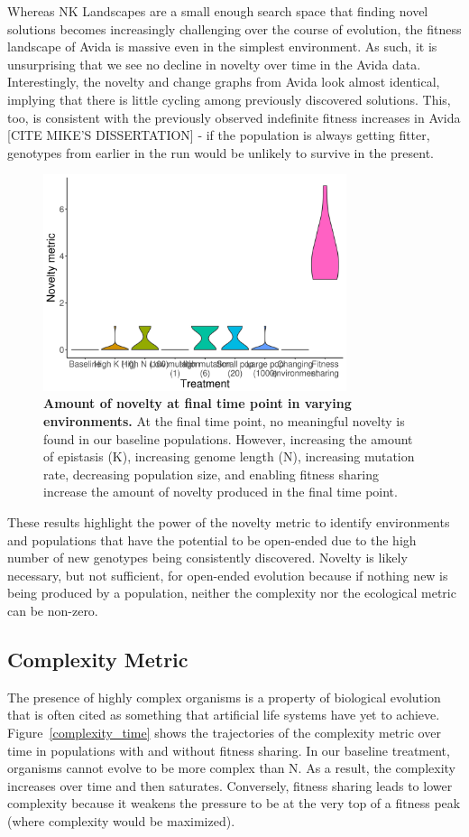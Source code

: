 \documentclass[letterpaper]{article}
\begin{document}
Whereas NK Landscapes are a small enough search space that finding novel solutions becomes increasingly challenging over the course of evolution, the fitness landscape of Avida is massive even in the simplest environment. As such, it is unsurprising that we see no decline in novelty over time in the Avida data. Interestingly, the novelty and change graphs from Avida look almost identical, implying that there is little cycling among previously discovered solutions. This, too, is consistent with the previously observed indefinite fitness increases in Avida [CITE MIKE'S DISSERTATION] - if the population is always getting fitter, genotypes from earlier in the run would be unlikely to survive in the present.

\begin{figure}
\includegraphics[width=3.5in]{figs/noveltyboxplots.png}
\caption{\textbf{Amount of novelty at final time point in varying environments.} At the final time point, no meaningful novelty is found in our baseline populations. However, increasing the amount of epistasis (K), increasing genome length (N), increasing mutation rate, decreasing population size, and enabling fitness sharing increase the amount of novelty produced in the final time point.}
\label{novelty}
\end{figure}

These results highlight the power of the novelty metric to identify environments and populations that have the potential to be open-ended due to the high number of new genotypes being consistently discovered. Novelty is likely necessary, but not sufficient, for open-ended evolution because if nothing new is being produced by a population, neither the complexity nor the ecological metric can be non-zero.

\subsection{Complexity Metric}
    The presence of highly complex organisms is a property of biological evolution that is often cited as something that artificial life systems have yet to achieve.  Figure~\ref{complexity_time} shows the trajectories of the complexity metric over time in populations with and without fitness sharing. In our baseline treatment, organisms cannot evolve to be more complex than N. As a result, the complexity increases over time and then saturates. Conversely, fitness sharing leads to lower complexity because it weakens the pressure to be at the very top of a fitness peak (where complexity would be maximized).
\end{document}
